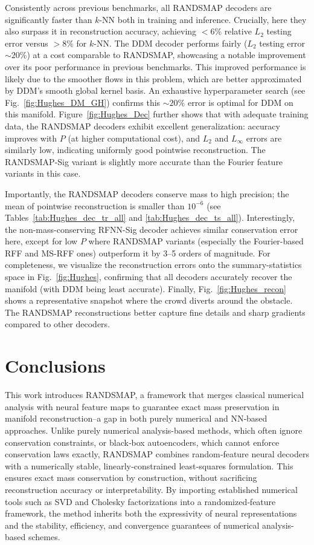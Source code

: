 \documentclass{article}
\begin{document}
Consistently across previous benchmarks, all RANDSMAP decoders are significantly faster than $k$-NN both in training and inference. Crucially, here they also surpass it in reconstruction accuracy, achieving $<6\%$ relative $L_2$ testing error versus $>8\%$ for $k$-NN. The DDM decoder performs fairly ($L_2$ testing error $\sim20\%$) at a cost comparable to RANDSMAP, showcasing a notable improvement over its poor performance in previous benchmarks. This improved performance is likely due to the smoother flows in this problem, which are better approximated by DDM's smooth global kernel basis. An exhaustive hyperparameter search (see Fig.~\ref{fig:Hughes_DM_GH}) confirms this $\sim20\%$ error is optimal for DDM on this manifold. Figure~\ref{fig:Hughes_Dec} further shows that with adequate training data, the RANDSMAP decoders exhibit excellent generalization: accuracy improves with $P$ (at higher computational cost), and $L_2$ and $L_\infty$ errors are similarly low, indicating uniformly good pointwise reconstruction. The RANDSMAP-Sig variant is slightly more accurate than the Fourier feature variants in this case.

Importantly, the RANDSMAP decoders conserve mass to high precision; the mean of pointwise reconstruction is smaller than $10^{-6}$ (see Tables~\ref{tab:Hughes_dec_tr_all} and \ref{tab:Hughes_dec_ts_all}). Interestingly, the non-mass-conserving RFNN-Sig decoder achieves similar conservation error here, except for low $P$ where RANDSMAP variants (especially the Fourier-based RFF and MS-RFF ones) outperform it by 3–5 orders of magnitude. For completeness, we visualize the reconstruction errors onto the summary-statistics space in Fig.~\ref{fig:Hughes}, confirming that all decoders accurately recover the manifold (with DDM being least accurate). Finally, Fig.~\ref{fig:Hughes_recon} shows a representative snapshot where the crowd diverts around the obstacle. The RANDSMAP reconstructions better capture fine details and sharp gradients compared to other decoders.   
\section{Conclusions}\label{sec:conclusions}
This work introduces RANDSMAP, a framework that merges classical numerical analysis with neural feature maps to guarantee exact mass preservation in manifold reconstruction--a gap in both purely numerical and NN‑based approaches. Unlike purely numerical analysis-based methods, which often ignore conservation constraints, or black‑box autoencoders, which cannot enforce conservation laws exactly, RANDSMAP combines random‑feature neural decoders with a numerically stable, linearly‑constrained least‑squares formulation. This ensures exact mass conservation by construction, without sacrificing reconstruction accuracy or interpretability. By importing established numerical tools such as SVD and Cholesky factorizations into a randomized‑feature framework, the method inherits both the expressivity of neural representations and the stability, efficiency, and convergence guarantees of numerical analysis-based schemes.
\end{document}
